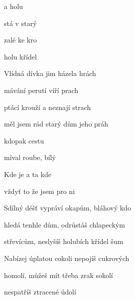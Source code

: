 

\zs
{}  a  holu

stá v   starý 

  zalé ke kro

   holu křídel 
\ks

\zs
Vlídná dívka jim házela hrách

mávání perutí víří prach

ptácí krouží a neznají strach

měl jsem rád starý dům jeho práh
\ks

\zr
{} 

kdopak  cestu 

míval  roube, bílý 

Kde je  a ta  kde 

vždyť to  že jsem  pro ni 
\kr

\zs
Sdílný déšť vypráví okapům, bláhový kdo

hledá tenhle dům, odrůstáš chlapeckým

střevícům, neslyšíš holubích křídel šum
\ks

\zs
Nabízej úplatou cokoli nepojíš cukrových

homolí, můžeš mít třeba zrak sokolí

nespatříš ztracené údolí
\ks

\zr  \kr

\kp






